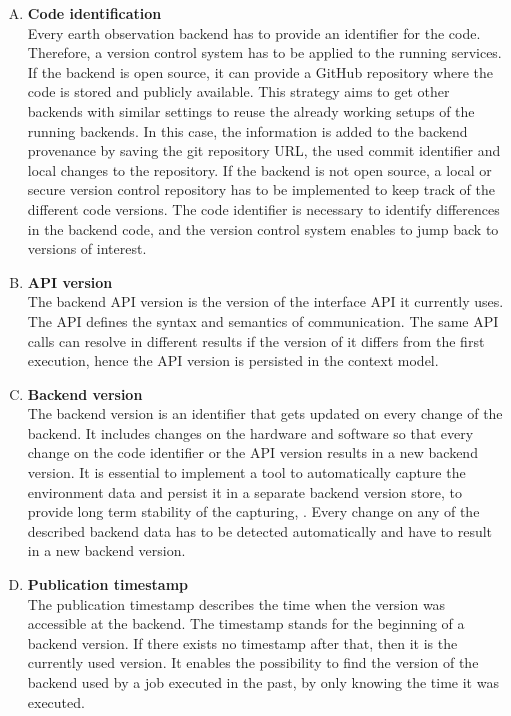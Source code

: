 \documentclass[draft,final]{vutinfth} %
\begin{document}
\begin{enumerate}[(A)]
	\item \textbf{Code identification} \\
	Every earth observation backend has to provide an identifier for the code. Therefore, a version control system has to be applied to the running services. If the backend is open source, it can provide a GitHub repository where the code is stored and publicly available. This strategy aims to get other backends with similar settings to reuse the already working setups of the running backends. In this case, the information is added to the backend provenance by saving the git repository URL, the used commit identifier and local changes to the repository. If the backend is not open source, a local or secure version control repository has to be implemented to keep track of the different code versions. The code identifier is necessary to identify differences in the backend code, and the version control system enables to jump back to versions of interest.  
	\item \textbf{API version} \\
	The backend API version is the version of the interface API it currently uses. The API defines the syntax and semantics of communication. The same API calls can resolve in different results if the version of it differs from the first execution, hence the API version is persisted in the context model.
	\item \textbf{Backend version} \\
	The backend version is an identifier that gets updated on every change of the backend. It includes changes on the hardware and software so that every change on the code identifier or the API version results in a new backend version. It is essential to implement a tool to automatically capture the environment data and persist it in a separate backend version store, to provide long term stability of the capturing, . Every change on any of the described backend data has to be detected automatically and have to result in a new backend version.   
	\item \textbf{Publication timestamp} \\
	The publication timestamp describes the time when the version was accessible at the backend. The timestamp stands for the beginning of a backend version. If there exists no timestamp after that, then it is the currently used version. It enables the possibility to find the version of the backend used by a job executed in the past, by only knowing the time it was executed.    
\end{enumerate}
\end{document}
